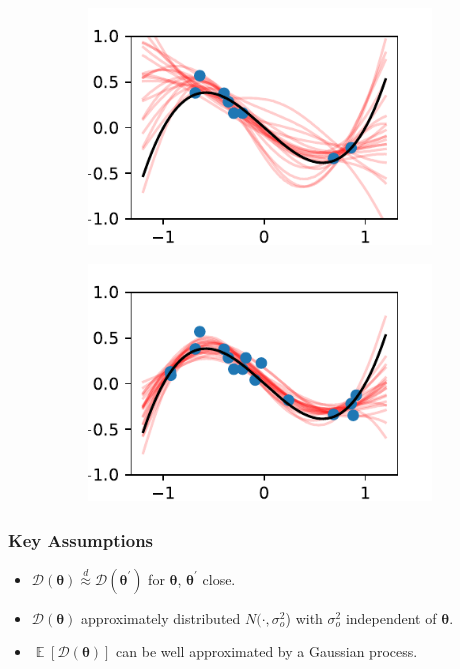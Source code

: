 \documentclass{beamer}
\DeclareMathOperator{\E}{\mathbb{E}}
\begin{document}
\begin{frame}
\begin{figure}
\begin{subfigure}[t]{0.4\textwidth}
            \includegraphics[width=\textwidth]{cub_GP_err_8_iters.pdf}
        \end{subfigure}%
        \begin{subfigure}[t]{0.4\textwidth}
            \centering
            \includegraphics[width=\textwidth]{cub_GP_err_16_iters.pdf}
        \end{subfigure}%
    \end{figure}
\end{frame}

\begin{frame}
    \frametitle{Key Assumptions}
    \begin{itemize}
        \item $\mathcal{D}(\bm{\theta})
                  \overset{d}{\approx} \mathcal{D}(\bm{\theta}^\prime)$ for
              $\bm{\theta}$, $\bm{\theta}^\prime$ close.
        \item $\mathcal{D}(\bm{\theta})$ approximately distributed
              $N(\cdot, \sigma^2_o$) with $\sigma^2_o$ independent of
              $\bm{\theta}.$
        \item $\E[\mathcal{D}(\bm{\theta})]$ can be well approximated by a
              Gaussian process.
    \end{itemize}
\end{frame}
\end{document}
